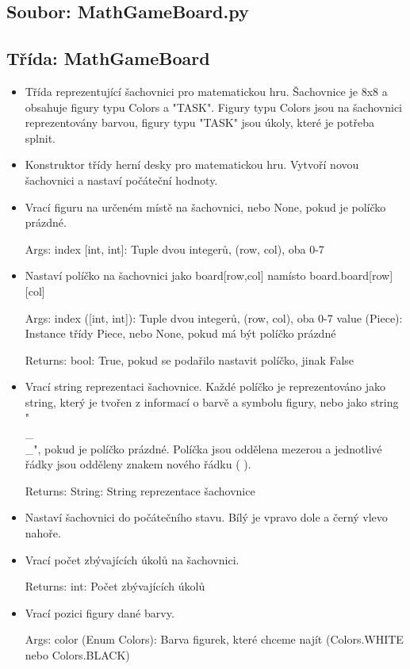 \documentclass{article}
\begin{document}
\subsection*{Soubor: MathGameBoard.py}
\begin{itemize}
 \subsection*{Třída: MathGameBoard}
\begin{itemize}
\item{Třída reprezentující šachovnici pro matematickou hru. Šachovnice je 8x8 a obsahuje figury typu Colors a "TASK". Figury typu Colors jsou na šachovnici reprezentovány barvou, figury typu "TASK" jsou úkoly, které je potřeba splnit. 
    }
\item{Konstruktor třídy herní desky pro matematickou hru. Vytvoří novou šachovnici a nastaví počáteční hodnoty.
      }
\item{Vrací figuru na určeném místě na šachovnici, nebo None, pokud je políčko prázdné. 

Args:
    index [int, int]: Tuple dvou integerů, (row, col), oba 0-7}
\item{Nastaví políčko na šachovnici jako board[row,col] namísto board.board[row][col] 

Args:
    index ([int, int]): Tuple dvou integerů, (row, col), oba 0-7
    value (Piece): Instance třídy Piece, nebo None, pokud má být políčko prázdné

Returns:
    bool: True, pokud se podařilo nastavit políčko, jinak False}
\item{Vrací string reprezentaci šachovnice. Každé políčko je reprezentováno jako string, který je tvořen z informací o barvě a symbolu figury, nebo jako string "\\_\\_", pokud je políčko prázdné. Políčka jsou oddělena mezerou a jednotlivé řádky jsou odděleny znakem nového řádku (
).
      
      Returns:
          String: String reprezentace šachovnice
      }
\item{Nastaví šachovnici do počátečního stavu. Bílý je vpravo dole a černý vlevo nahoře.}
\item{Vrací počet zbývajících úkolů na šachovnici.

Returns:
    int: Počet zbývajících úkolů}
\item{Vrací pozici figury dané barvy.

Args:
    color (Enum Colors): Barva figurek, které chceme najít (Colors.WHITE nebo Colors.BLACK)

}
\end{itemize}
\end{itemize}
\end{document}
